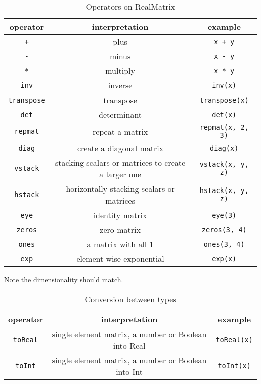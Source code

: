 \documentclass[12pt]{article}
\begin{document}
\begin{table}[H]
\centering
\caption{Operators on RealMatrix
\label{tab:matrixop}
}
\begin{tabular}{ c c c }
\toprule 
operator & interpretation & example \\
\midrule
\verb|+| & plus & \verb|x + y| \\ 
\verb|-| & minus & \verb|x - y| \\ 
\verb|*| & multiply & \verb|x * y| \\
\verb|inv| & inverse & \verb|inv(x)| \\
\verb|transpose| & transpose & \verb|transpose(x)| \\
\verb|det| & determinant & \verb|det(x)| \\
\verb|repmat| & repeat a matrix & \verb|repmat(x, 2, 3)| \\
\verb|diag| & create a diagonal matrix & \verb|diag(x)| \\
\verb|vstack| & stacking scalars or matrices to create a larger one & \verb|vstack(x, y, z)| \\
\verb|hstack| & horizontally stacking scalars or matrices & \verb|hstack(x, y, z)| \\
\verb|eye| & identity matrix & \verb|eye(3)| \\
\verb|zeros| & zero matrix & \verb|zeros(3, 4)| \\
\verb|ones| & a matrix with all 1 & \verb|ones(3, 4)| \\
\verb|exp| & element-wise exponential  & \verb|exp(x)| \\
\bottomrule
\end{tabular}

Note the dimensionality should match. 
\end{table}

\begin{table}[H]
\centering
\caption{Conversion between types
\label{tab:conversion}
}
\begin{tabular}{ c c c }
\toprule 
operator & interpretation & example \\
\midrule
\verb|toReal| & single element matrix, a number or Boolean into Real & \verb|toReal(x)| \\
\verb|toInt| & single element matrix, a number or Boolean into Int & \verb|toInt(x)| \\
\bottomrule
\end{tabular}
\end{table}
\end{document}
